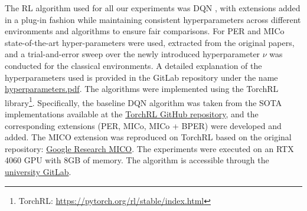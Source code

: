 The RL algorithm used for all our experiments was DQN \cite{mnih2013playing}, with extensions added in a plug-in fashion while maintaining consistent hyperparameters across different environments and algorithms to ensure fair comparisons. For PER and MICo state-of-the-art hyper-parameters were used, extracted from the original papers, and a trial-and-error sweep over the newly introduced hyperparameter \(\nu\) was conducted for the classical environments. A detailed explanation of the hyperparameters used is provided in the GitLab repository under the name \href{https://git.cs.bham.ac.uk/projects-2023-24/oxg397/-/blob/master/hyperparameters.pdf}{hyperparameters.pdf}.
The algorithms were implemented using the TorchRL library\footnote{TorchRL: \href{https://pytorch.org/rl/stable/index.html}{https://pytorch.org/rl/stable/index.html}}. Specifically, the baseline DQN algorithm was taken from the SOTA implementations available at the \href{https://github.com/pytorch/rl/tree/main/sota-implementations/dqn}{TorchRL GitHub repository}, and the corresponding extensions (PER, MICo, MICo + BPER) were developed and added. The MICO extension was reproduced on TorchRL based on the original repository: \href{https://github.com/google-research/google-research/tree/master/mico}{Google Research MICO}. The experiments were executed on an RTX 4060 GPU with 8GB of memory. The algorithm is accessible through the \href{https://git.cs.bham.ac.uk/projects-2023-24/oxg397}{university GitLab}. %



